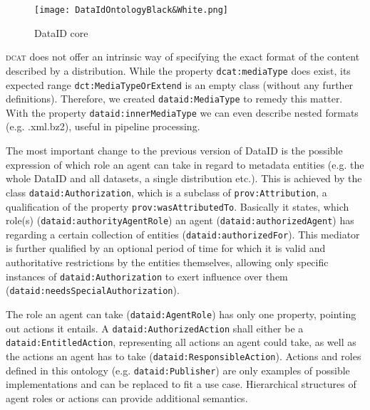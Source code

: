 \documentclass[runningheads,a4paper]{llncs}
\newcommand{\dcat}{{\scshape dcat}\xspace}
\newcommand{\prop}[1]{{{\texttt{#1}}}}
\begin{document}
\begin{figure}
\centering
  \texttt{[image: DataIdOntologyBlack\&White.png]}
  \caption{DataID core}
  \label{fig:core}
  \vspace{-1.5em}
\end{figure}

\dcat does not offer an intrinsic way of specifying the exact format of the content described by a distribution. While the property \prop{dcat:mediaType} does exist, its expected range \prop{dct:MediaTypeOrExtend} is an empty class (without any further definitions).
Therefore, we created \prop{dataid:MediaType} to remedy this matter. With the property \prop{dataid:innerMediaType} we can even describe nested formats (e.g. .xml.bz2), useful in pipeline processing.

The most important change to the previous version of DataID is the possible expression of which role an agent can take in regard to metadata entities (e.g. the whole DataID and all datasets, a single distribution etc.).
This is achieved by the class \prop{dataid:Authorization}, which is a subclass of \prop{prov:Attribution}, a qualification of the property \prop{prov:wasAttributedTo}. Basically it states, which role(s) (\prop{dataid:authorityAgentRole}) an agent (\prop{dataid:authorizedAgent}) has regarding a certain collection of entities (\prop{dataid:authorizedFor}). This mediator is further qualified by an optional period of time for which it is valid and authoritative restrictions by the entities themselves, allowing only specific instances of \prop{dataid:Authorization} to exert influence over them (\prop{dataid:needsSpecialAuthorization}).%


The role an agent can take (\prop{dataid:AgentRole}) has only one property, pointing out actions it entails. A \prop{dataid:AuthorizedAction} shall either be a \prop{dataid:EntitledAction}, representing all actions an agent could take, as well as the actions an agent has to take (\prop{dataid:ResponsibleAction}). Actions and roles defined in this ontology (e.g. \prop{dataid:Publisher}) are only examples of possible implementations and can be replaced to fit a use case.
Hierarchical structures of agent roles or actions can provide additional semantics.
\end{document}
